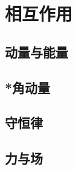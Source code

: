 

\section{相互作用}\label{28-2}

\subsection{动量与能量}\label{28-2-1}

\subsection{*角动量}\label{28-2-2}

\subsection{守恒律}\label{28-2-3}

\subsection{力与场}\label{28-2-4}
